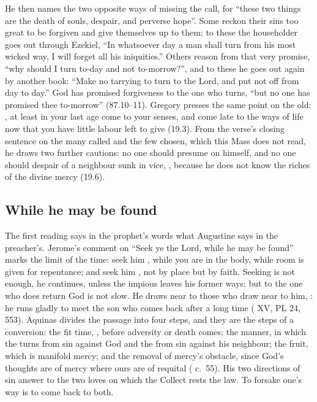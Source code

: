 He then names the two opposite ways of missing the call, for ``these two
things are the death of souls, despair, and perverse hope''. Some reckon their sins
too great to be forgiven and give themselves up to them; to these the
householder goes out through Ezekiel, ``In whatsoever day a man shall turn
from his most wicked way, I will forget all his iniquities.'' Others reason
from that very promise, ``why should I turn to-day and not to-morrow?'', and to
these he goes out again by another book: ``Make no tarrying to turn to the
Lord, and put not off from day to day.'' God has promised forgiveness to the
one who turns, ``but no one has promised thee to-morrow'' (87.10--11). Gregory
presses the same point on the old: , at least in your last age come to your senses, and come late to
the ways of life now that you have little labour left to give (19.3). From the
verse's closing sentence on the many called and the few chosen, which this
Mass does not read, he draws two further cautions: no one should presume on
himself, and no one should despair of a neighbour sunk in vice, , because he does not know the riches
of the divine mercy (19.6).

\subsection{While he may be found}

The first reading says in the prophet's words what Augustine says in the
preacher's. Jerome's comment on ``Seek ye the Lord, while he may be found''
marks the limit of the time: seek him , while you are in the body, while room is given for
repentance; and seek him , not by place but by
faith. Seeking is not enough, he continues, unless the impious leaves his
former ways; but to the one who does return God is not slow. He draws near to
those who draw near to him, : he runs gladly to meet the son who comes back after a long
time ( XV, PL 24, 553). Aquinas divides the passage into four
steps, and they are the steps of a conversion: the fit time, , before adversity or death comes; the manner, in
which the  turns from sin against God and the 
from sin against his neighbour; the fruit, which is manifold mercy; and the
removal of mercy's obstacle, since God's thoughts are of mercy where ours are
of requital ( c.~55). His two directions of sin answer to the two
loves on which the Collect rests the law. To forsake one's way is to come back
to both.

